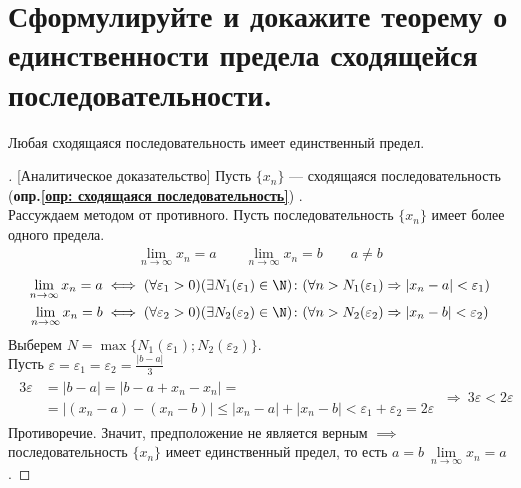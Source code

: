 
\usepackage{tocloft}
\setlength{\cftsubsecnumwidth}{2.8em}


\tableofcontents
\newpage

\section{Сформулируйте и докажите теорему о единственности предела сходящейся последовательности.}

\begin{theorem}
  Любая сходящаяся последовательность имеет единственный предел.
\end{theorem}
\begin{proof}[][Аналитическое доказательство]
  Пусть $\{x_{n}\} $ --- сходящаяся последовательность (\textbf{опр.\ref{опр: сходящаяся последовательность}}) . \\
  Рассуждаем методом от противного. Пусть последовательность $\{x_{n}\} $ имеет более одного предела. \vspace{-\topsep}
  \begin{gather*}
    \lim_{n \to \infty} x_n = a \qquad \lim_{n \to \infty} x_n = b \qquad a \neq b 
  \end{gather*} \vspace{-2\topsep}
  \begin{gather}
    \lim_{n \to \infty} x_n = a \iff (\forall \varepsilon_1 > 0)(\exists N_1(\varepsilon_1) \in \N)\colon (\forall n > N_1(\varepsilon_1) \Rightarrow |x_{n} - a| < \varepsilon_1) \\
    \lim_{n \to \infty} x_n = b \iff (\forall \varepsilon_2 > 0)(\exists N_2(\varepsilon_2) \in \N)\colon (\forall n > N_2(\varepsilon_2) \Rightarrow |x_{n} - b| < \varepsilon_2)  
  \end{gather} 
  Выберем $N= \max \{N_1\left( \varepsilon_1 \right); N_2\left( \varepsilon_2 \right) \}$. \\[1ex]
  Пусть $\displaystyle \varepsilon = \varepsilon_1 = \varepsilon_2 = \frac{|b - a|}{3}$
  \begin{gather*}
    \begin{aligned}
      3 \varepsilon &= |b - a| = |b - a + x_{n} - x_{n}| = \\
      &= |(x_{n} - a) - (x_{n} - b)| \le |x_{n} - a| + |x_{n} - b| < \varepsilon_1 + \varepsilon_2 = 2 \varepsilon
    \end{aligned}\ \Rightarrow\ 3 \varepsilon < 2 \varepsilon
  \end{gather*}
  Противоречие. Значит, предположение не является верным $\implies$ последовательность $\{x_{n}\}$ имеет единственный предел, то есть $a=b\ \lim\limits_{n \to \infty} x_n = a$.
\end{proof}

